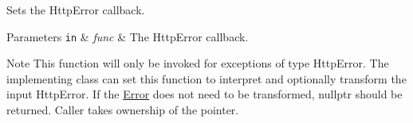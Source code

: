 Sets the Http\+Error callback. 


\begin{DoxyParams}[1]{Parameters}
\mbox{\tt in}  & {\em func} & The Http\+Error callback.\\
\hline
\end{DoxyParams}
\begin{DoxyNote}{Note}
This function will only be invoked for exceptions of type Http\+Error. The implementing class can set this function to interpret and optionally transform the input Http\+Error. If the \hyperlink{classdg_1_1deepcore_1_1_error}{Error} does not need to be transformed, nullptr should be returned. Caller takes ownership of the pointer. 
\end{DoxyNote}
